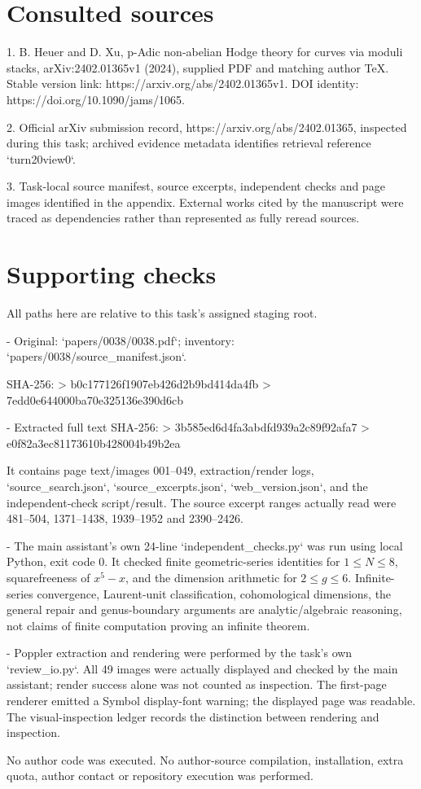 \documentclass[10pt]{article}
\begin{document}
\section*{Consulted sources}
1. B. Heuer and D. Xu, p-Adic non-abelian Hodge theory for curves via moduli stacks, arXiv:2402.01365v1 (2024), supplied PDF and matching author TeX. Stable version link: https://arxiv.org/abs/2402.01365v1. DOI identity: https://doi.org/10.1090/jams/1065.\par
2. Official arXiv submission record, https://arxiv.org/abs/2402.01365, inspected during this task; archived evidence metadata identifies retrieval reference `turn20view0`.\par
3. Task-local source manifest, source excerpts, independent checks and page images identified in the appendix. External works cited by the manuscript were traced as dependencies rather than represented as fully reread sources.\par
\section*{Supporting checks}
All paths here are relative to this task’s assigned staging root.\par
- Original: `papers/0038/0038.pdf`; inventory: `papers/0038/source\_manifest.json`.\par
SHA-256:
  > b0c177126f1907eb426d2b9bd414da4fb
> 7edd0e644000ba70e325136e390d6cb\par
- Extracted full text SHA-256:
  > 3b585ed6d4fa3abdfd939a2c89f92afa7
> e0f82a3ec81173610b428004b49b2ea\par
It contains page text/images 001–049, extraction/render logs, `source\_search.json`, `source\_excerpts.json`, `web\_version.json`, and the independent-check script/result. The source excerpt ranges actually read were 481–504, 1371–1438, 1939–1952 and 2390–2426.\par
- The main assistant’s own 24-line `independent\_checks.py` was run using local Python, exit code 0. It checked finite geometric-series identities for \(1\leq N\leq8\), squarefreeness of \(x^5-x\), and the dimension arithmetic for \(2\leq g\leq6\). Infinite-series convergence, Laurent-unit classification, cohomological dimensions, the general repair and genus-boundary arguments are analytic/algebraic reasoning, not claims of finite computation proving an infinite theorem.\par
- Poppler extraction and rendering were performed by the task’s own `review\_io.py`. All 49 images were actually displayed and checked by the main assistant; render success alone was not counted as inspection. The first-page renderer emitted a Symbol display-font warning; the displayed page was readable. The visual-inspection ledger records the distinction between rendering and inspection.\par
No author code was executed. No author-source compilation, installation, extra quota, author contact or repository execution was performed.\par
\end{document}
